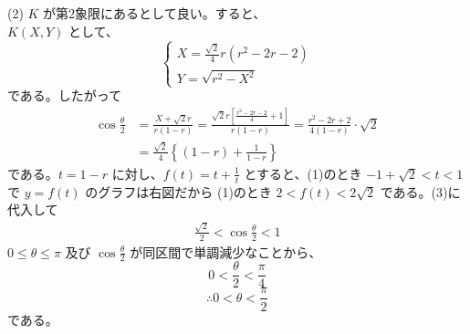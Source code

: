 \documentclass[../main.tex]{subfiles}
\begin{document}
\noindent
(2) $K$ が第2象限にあるとして良い。すると、\\
$K(X, Y)$ として、
\[
  \begin{cases}
    X = \frac{\sqrt{2}}{4}r (r^2 - 2r - 2) \\
    Y = \sqrt{r^2 - X^2}
  \end{cases}
\]
である。したがって
\begin{align*}
  \cos \frac{\theta}{2} &= \frac{X + \sqrt{2}r}{r(1-r)} = \frac{\sqrt{2}r \left[ \frac{r^2-2r-2}{4} + 1 \right]}{r(1-r)} = \frac{r^2-2r+2}{4(1-r)} \cdot \sqrt{2} \\
  &= \frac{\sqrt{2}}{4} \left\{ (1-r) + \frac{1}{1-r} \right\} \tag{3}
\end{align*}
である。$t = 1-r$ に対し、$f(t) = t + \frac{1}{t}$ とすると、(1)のとき $-1+\sqrt{2} < t < 1$ で $y = f(t)$ のグラフは右図だから (1)のとき $2 < f(t) < 2\sqrt{2}$ である。(3)に代入して
\begin{align}
  \frac{\sqrt{2}}{2} < \cos \frac{\theta}{2} < 1 \tag{4}
\end{align}
$0 \le \theta \le \pi$ 及び $\cos \frac{\theta}{2}$ が同区間で単調減少なことから、
\[
  0 < \frac{\theta}{2} < \frac{\pi}{4}
\]
\[
  \therefore 0 < \theta < \frac{\pi}{2}
\]
である。
\end{document}
